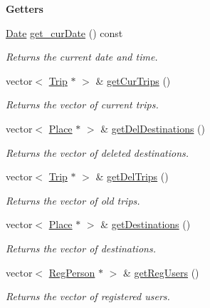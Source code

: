 \begin{Indent}{\bf Getters}\par
\begin{DoxyCompactItemize}
\item 
\hyperlink{class_date}{Date} \hyperlink{class_logic_a0bff2c63fd9cbbf7be9db9f551045c96}{get\+\_\+cur\+Date} () const 
\begin{DoxyCompactList}\small\item\em Returns the current date and time. \end{DoxyCompactList}\item 
vector$<$ \hyperlink{class_trip}{Trip} $\ast$ $>$ \& \hyperlink{class_logic_a9cf4f76206c9df41e74ef36675854012}{get\+Cur\+Trips} ()
\begin{DoxyCompactList}\small\item\em Returns the vector of current trips. \end{DoxyCompactList}\item 
vector$<$ \hyperlink{class_place}{Place} $\ast$ $>$ \& \hyperlink{class_logic_a297112503dec7a8453cb4ad8c810f10e}{get\+Del\+Destinations} ()
\begin{DoxyCompactList}\small\item\em Returns the vector of deleted destinations. \end{DoxyCompactList}\item 
vector$<$ \hyperlink{class_trip}{Trip} $\ast$ $>$ \& \hyperlink{class_logic_a87dea89ef7617620d84deeab9a26879a}{get\+Del\+Trips} ()
\begin{DoxyCompactList}\small\item\em Returns the vector of old trips. \end{DoxyCompactList}\item 
vector$<$ \hyperlink{class_place}{Place} $\ast$ $>$ \& \hyperlink{class_logic_a044198f83942209c8ba58fd8fc478be7}{get\+Destinations} ()
\begin{DoxyCompactList}\small\item\em Returns the vector of destinations. \end{DoxyCompactList}\item 
vector$<$ \hyperlink{class_reg_person}{Reg\+Person} $\ast$ $>$ \& \hyperlink{class_logic_aeee57ae85000766bde4884e54575e705}{get\+Reg\+Users} ()
\begin{DoxyCompactList}\small\item\em Returns the vector of registered users. \end{DoxyCompactList}\end{DoxyCompactItemize}
\end{Indent}
